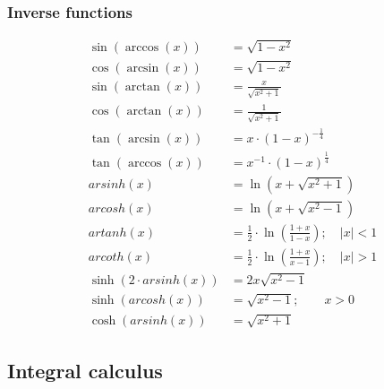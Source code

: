 \subsubsection{Inverse functions}
\begin{align*}
    \sin(\arccos(x))         & = \sqrt{1-x^2}                                                 \\
    \cos(\arcsin(x))         & =\sqrt{1-x^2}                                                  \\
    \sin(\arctan(x))         & =\frac{x}{\sqrt{x^2+1}}                                        \\
    \cos(\arctan(x))         & =\frac{1}{\sqrt{x^2+1}}                                        \\
    \tan(\arcsin(x))         & =x \cdot {(1-x)}^{-\frac{1}{4}}                                \\
    \tan(\arccos(x))         & =x^{-1} \cdot {(1-x)}^{\frac{1}{4}}                            \\
    arsinh(x)                & =\ln(x+\sqrt{x^2+1})                                           \\
    arcosh(x)                & =\ln(x+\sqrt{x^2-1})                                           \\
    artanh(x)                & =\frac{1}{2}\cdot \ln(\frac{1+x}{1-x}); \quad \vert x\vert < 1 \\
    arcoth(x)                & =\frac{1}{2}\cdot \ln(\frac{1+x}{x-1}); \quad \vert x\vert > 1 \\
    \sinh(2 \cdot arsinh(x)) & =2x\sqrt{x^2-1}                                                \\
    \sinh(arcosh(x))         & =\sqrt{x^2-1};\qquad x>0                                       \\
    \cosh(arsinh(x))         & =\sqrt{x^2+1}
\end{align*}


\subsection{Integral calculus}

